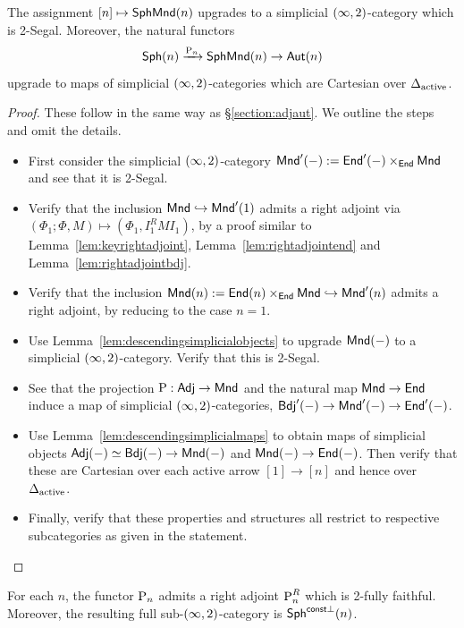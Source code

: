 \begin{prop}\label{prop:simplicialsphmnd}
    The assignment $[n]\mapsto \mathsf{SphMnd}(n)$ upgrades to a simplicial $(\infty,2)$-category which is 2-Segal. Moreover, the natural functors
    \[\mathsf{Sph}(n)\xrightarrow{\operatorname{P}_n} \mathsf{SphMnd}(n)\to \mathsf{Aut}(n)\]
    upgrade to maps of simplicial $(\infty,2)$-categories which are Cartesian over $\Delta_{\operatorname{active}}$.
\end{prop}

\begin{proof}
    These follow in the same way as \S\ref{section:adjaut}. We outline the steps and omit the details.
    \begin{itemize}
        \item First consider the simplicial $(\infty,2)$-category $\mathsf{Mnd}'(-) := \mathsf{End}'(-)\times_{\mathsf{End}}\mathsf{Mnd}$ and see that it is 2-Segal.
        \item Verify that the inclusion $\mathsf{Mnd}\hookrightarrow \mathsf{Mnd}'(1)$ admits a right adjoint via $(\Phi_1;\Phi,M)\mapsto (\Phi_1,I_1^RMI_1)$, by a proof similar to Lemma~\ref{lem:keyrightadjoint}, Lemma~\ref{lem:rightadjointend} and Lemma~\ref{lem:rightadjointbdj}.
        \item Verify that the inclusion $\mathsf{Mnd}(n):= \mathsf{End}(n)\times_{\mathsf{End}}\mathsf{Mnd}\hookrightarrow \mathsf{Mnd}'(n)$ admits a right adjoint, by reducing to the case $n=1$.
        \item Use Lemma~\ref{lem:descendingsimplicialobjects} to upgrade $\mathsf{Mnd}(-)$ to a simplicial $(\infty,2)$-category. Verify that this is 2-Segal.
        \item See that the projection $\operatorname{P}:\mathsf{Adj}\to \mathsf{Mnd}$ and the natural map $\mathsf{Mnd}\to \mathsf{End}$ induce a map of simplicial $(\infty,2)$-categories, $\mathsf{Bdj}'(-)\to\mathsf{Mnd}'(-)\to \mathsf{End}'(-)$.
        \item Use Lemma~\ref{lem:descendingsimplicialmaps} to obtain maps of simplicial objects $\mathsf{Adj}(-)\simeq\mathsf{Bdj}(-)\to\mathsf{Mnd}(-)$ and $\mathsf{Mnd}(-)\to\mathsf{End}(-)$. Then verify that these are Cartesian over each active arrow $[1]\to [n]$ and hence over $\Delta_{\operatorname{active}}$.
        \item Finally, verify that these properties and structures all restrict to respective subcategories as given in the statement.
    \end{itemize}
\end{proof}

\begin{prop}\label{prop:monadisortho}
    For each $n$, the functor $\operatorname{P}_n$ admits a right adjoint $\operatorname{P}_n^R$ which is 2-fully faithful. Moreover, the resulting full sub-$(\infty,2)$-category is $\mathsf{Sph}^{\mathsf{const}\perp}(n)$.
\end{prop}

